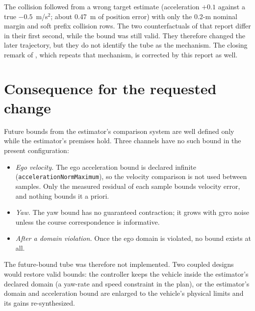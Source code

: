 \documentclass[11pt]{article}
\begin{document}
The collision followed from a wrong target estimate (acceleration $+0.1$
against a true $-0.5$~m/s$^2$; about 0.47~m of position error) with only the
0.2-m nominal margin and soft prefix collision rows. The two counterfactuals of
that report differ in their first second, while the bound was still valid.
They therefore changed the later trajectory, but they do not identify the tube
as the mechanism. The closing remark of ,
which repeats that mechanism, is corrected by this report as well.

\section{Consequence for the requested change}
Future bounds from the estimator's comparison system are well defined only
while the estimator's premises hold. Three channels have no such bound in the
present configuration:
\begin{itemize}
\item \emph{Ego velocity.} The ego acceleration bound is declared infinite
  (\texttt{accelerationNormMaximum}), so the velocity comparison is not used
  between samples. Only the measured residual of each sample bounds velocity
  error, and nothing bounds it a priori.
\item \emph{Yaw.} The yaw bound has no guaranteed contraction; it grows with
  gyro noise unless the course correspondence is informative.
\item \emph{After a domain violation.} Once the ego domain is violated, no
  bound exists at all.
\end{itemize}
The future-bound tube was therefore not implemented. Two coupled designs
would restore valid bounds: the controller keeps the vehicle inside the
estimator's declared domain (a yaw-rate and speed constraint in the plan),
or the estimator's domain and acceleration bound are enlarged to the
vehicle's physical limits and its gains re-synthesized.
\end{document}
